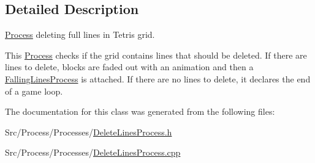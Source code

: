 \subsection{Detailed Description}
\hyperlink{classProcess}{Process} deleting full lines in Tetris grid. 

This \hyperlink{classProcess}{Process} checks if the grid contains lines that should be deleted. If there are lines to delete, blocks are faded out with an animation and then a \hyperlink{classFallingLinesProcess}{Falling\-Lines\-Process} is attached. If there are no lines to delete, it declares the end of a game loop. 

The documentation for this class was generated from the following files\-:\begin{DoxyCompactItemize}
\item 
Src/\-Process/\-Processes/\hyperlink{DeleteLinesProcess_8h}{Delete\-Lines\-Process.\-h}\item 
Src/\-Process/\-Processes/\hyperlink{DeleteLinesProcess_8cpp}{Delete\-Lines\-Process.\-cpp}\end{DoxyCompactItemize}
